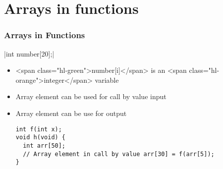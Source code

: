 \documentclass{../c-lecture}
\begin{document}
\section{Arrays in functions}

\begin{frame}[fragile]
  \frametitle{Arrays in Functions}
  |int number[20];|
  \begin{itemize}
    \item
      <span class="hl-green">number[i]</span> is an
      <span class="hl-orange">integer</span> variable

    \item Array element can be used for call by value input
    \item Array element can be use for output
    \begin{verbatim}
int f(int x);
void h(void) {
  int arr[50];
  // Array element in call by value arr[30] = f(arr[5]);
}
    \end{verbatim}
  \end{itemize}
\end{frame}
\end{document}
